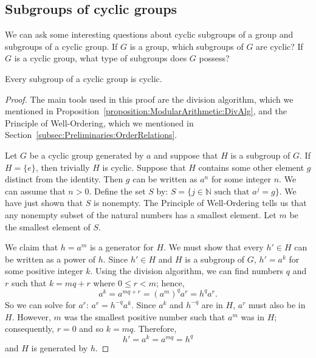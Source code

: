 


  
\subsection{Subgroups of cyclic groups}
\label{subsec:Groups:CyclicGroups:CyclicSubgroups2}
 
 
We can ask some interesting questions about cyclic subgroups of a
group and subgroups of a cyclic group.  If $G$ is a group, which
subgroups of $G$ are cyclic? If $G$ is a cyclic group, what type of
subgroups does $G$ possess? 
 
 
 
\begin{prop}{}
Every subgroup of a cyclic group is cyclic.
\end{prop}
 
 
\begin{proof}
The main tools used in this proof are the division algorithm, which we mentioned in Proposition~\ref{proposition:ModularArithmetic:DivAlg},  and the
Principle of Well-Ordering, which we mentioned in Section~\ref{subsec:Preliminaries:OrderRelations}.
 
Let $G$ be a cyclic group generated by $a$
and suppose that $H$ is a subgroup of $G$. If $H = \{ e \}$, then
trivially $H$ is cyclic. Suppose that $H$ contains some other element
$g$ distinct from the identity. Then $g$ can be written as
$a^n$ for some integer $n$. We can assume that $n > 0$.  
 Define the set $S$ by:  $S = \{j \in \mathbb{N} \text{ such that } a^j=g\}$. We have just shown that $S$ is nonempty. The Principle of Well-Ordering tells us that any nonempty subset of the natural numbers has  a smallest element.  Let $m$ be the smallest element of $S$.

We claim that $h = a^m$ is a generator for $H$.  We must show that
every $h' \in H$ can be written as a power of $h$. Since $h' \in H$
and $H$ is a subgroup of $G$, $h' = a^k$ for some positive integer
$k$. Using the division algorithm, we can find numbers $q$ and $r$
such that $k = mq +r$ where $0 \leq r < m$; hence,
\[
a^k = a^{mq +r} = (a^m)^q a^r = h^q a^r.
\]
So we can solve for $a^r$:  $a^r =h^{-q}  a^k $. Since $a^k$ and $h^{-q}$ are in $H$, $a^r$ must
also be in $H$.  However, $m$ was the smallest positive number such that
$a^m$ was in $H$; consequently, $r=0$ and so $k=mq$. Therefore, 
\[
h' = a^k = a^{mq} =  h^q
\]
and $H$ is generated by $h$.
\end{proof}
 
